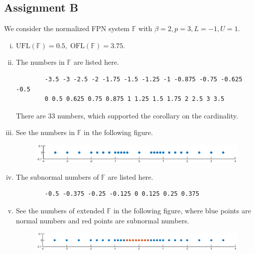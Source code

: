 \documentclass[11pt,en]{elegantpaper}
\begin{document}
\subsection{Assignment B}

We consider the normalized FPN system $\mathbb{F}$ with $\beta=2,p=3,L=-1,U=1$.

\begin{enumerate}[(i)]
    \item $\text{UFL}(\mathbb{F})=0.5,\;\text{OFL}(\mathbb{F})=3.75$.
    \item The numbers in $\mathbb{F}$ are listed here.
    \begin{lstlisting}
        -3.5 -3 -2.5 -2 -1.75 -1.5 -1.25 -1 -0.875 -0.75 -0.625 -0.5 
        0 0.5 0.625 0.75 0.875 1 1.25 1.5 1.75 2 2.5 3 3.5
    \end{lstlisting}
    There are $33$ numbers, which supported the corollary on the cardinality.
    \item See the numbers in $\mathbb{F}$ in the following figure.
    \begin{figure}[H]
        \centering
        \includegraphics[width=\textwidth]{figure/FPN.eps}
    \end{figure}
    \item The subnormal numbers of $\mathbb{F}$ are listed here.
    \begin{lstlisting}
        -0.5 -0.375 -0.25 -0.125 0 0.125 0.25 0.375
    \end{lstlisting}
    \item See the numbers of extended $\mathbb{F}$ in the following figure, where blue points are normal numbers and red points are subnormal numbers.
    \begin{figure}[H]
        \centering
        \includegraphics[width=\textwidth]{figure/FPNext.eps}
    \end{figure}
\end{enumerate}
\end{document}
